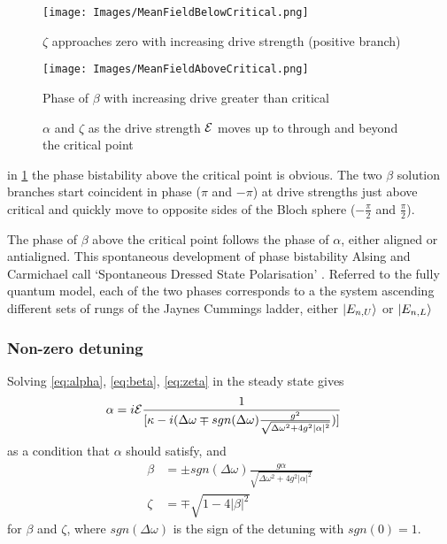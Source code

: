 \begin{figure}[h]
  \begin{minipage}{.5\linewidth}
    \centering
    \texttt{[image: Images/MeanFieldBelowCritical.png]}
    \caption{$\zeta$ approaches zero with increasing drive strength (positive branch)}\label{fig:zeta}
  \end{minipage}%
  \begin{minipage}{.5\linewidth}
    \centering
    \texttt{[image: Images/MeanFieldAboveCritical.png]}
    \caption{Phase of $\beta$ with increasing drive greater than critical}\label{fig:alpha}
  \end{minipage}
  \caption{$\alpha$ and $\zeta$ as the drive strength $\mathcal{E}$ moves up to through and beyond the critical point}
\end{figure}

in \cref{fig:alpha} the phase bistability above the critical point is obvious. The two $\beta$ solution branches start coincident in phase ($\pi$ and $-\pi$) at drive strengths just above critical and quickly move to opposite sides of the Bloch sphere ($-\frac{\pi}{2}$ and $\frac{\pi}{2}$).

The phase of $\beta$ above the critical point follows the phase of $\alpha$, either aligned or antialigned. This spontaneous development of phase bistability Alsing and Carmichael call `Spontaneous Dressed State Polarisation' \cite{Alsing1990}. Referred to the fully quantum model, each of the two phases corresponds to a the system ascending different sets of rungs of the Jaynes Cummings ladder, either $| E_{n, U} \rangle$ or $| E_{n, L} \rangle$
\subsubsection{Non-zero detuning}
Solving \cref{eq:alpha}, \cref{eq:beta}, \cref{eq:zeta} in the steady state gives
\begin{align}
  \alpha& = i \mathcal{E}\frac{1}{[\kappa-i(\Delta \omega \mp sgn(\Delta \omega) \frac{g^2}{\sqrt{\Delta \omega^2 +4g^2 |\alpha|^2}})]}
\end{align}
as a condition that $\alpha$ should satisfy, and
\begin{align}
  \beta& = \pm sgn(\Delta \omega) \frac{g \alpha}{\sqrt{\Delta \omega^2 + 4 g^2 |\alpha|^2}}\\
  \zeta& = \mp \sqrt{1-4|\beta|^2}
\end{align}
for $\beta$ and $\zeta$, where $sgn(\Delta \omega)$ is the sign of the detuning with $sgn(0) = 1$.

